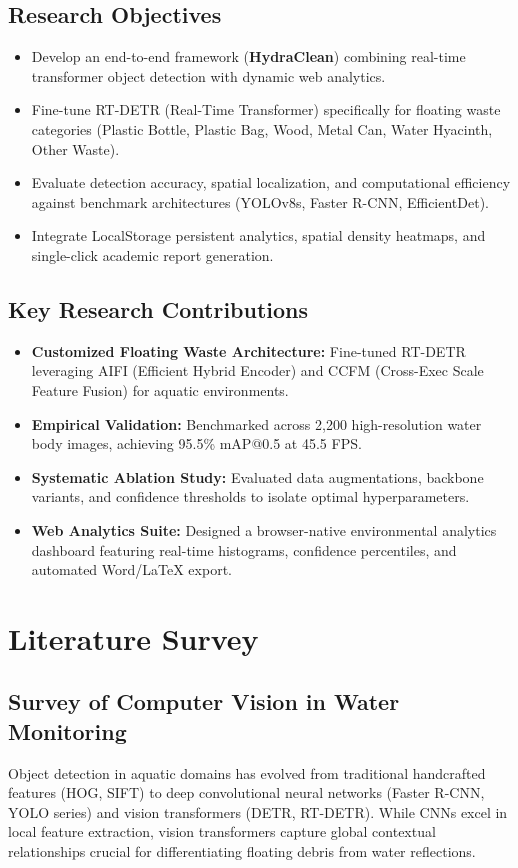 \documentclass[10pt,journal,compsoc]{IEEEtran}
\begin{document}
\subsection{Research Objectives}
\begin{itemize}
    \item Develop an end-to-end framework (\textbf{HydraClean}) combining real-time transformer object detection with dynamic web analytics.
    \item Fine-tune RT-DETR (Real-Time Transformer) specifically for floating waste categories (Plastic Bottle, Plastic Bag, Wood, Metal Can, Water Hyacinth, Other Waste).
    \item Evaluate detection accuracy, spatial localization, and computational efficiency against benchmark architectures (YOLOv8s, Faster R-CNN, EfficientDet).
    \item Integrate LocalStorage persistent analytics, spatial density heatmaps, and single-click academic report generation.
\end{itemize}

\subsection{Key Research Contributions}
\begin{itemize}
    \item \textbf{Customized Floating Waste Architecture:} Fine-tuned RT-DETR leveraging AIFI (Efficient Hybrid Encoder) and CCFM (Cross-Exec Scale Feature Fusion) for aquatic environments.
    \item \textbf{Empirical Validation:} Benchmarked across 2,200 high-resolution water body images, achieving 95.5\% mAP@0.5 at 45.5 FPS.
    \item \textbf{Systematic Ablation Study:} Evaluated data augmentations, backbone variants, and confidence thresholds to isolate optimal hyperparameters.
    \item \textbf{Web Analytics Suite:} Designed a browser-native environmental analytics dashboard featuring real-time histograms, confidence percentiles, and automated Word/LaTeX export.
\end{itemize}

\section{Literature Survey}

\subsection{Survey of Computer Vision in Water Monitoring}
Object detection in aquatic domains has evolved from traditional handcrafted features (HOG, SIFT) to deep convolutional neural networks (Faster R-CNN, YOLO series) and vision transformers (DETR, RT-DETR). While CNNs excel in local feature extraction, vision transformers capture global contextual relationships crucial for differentiating floating debris from water reflections.
\end{document}
